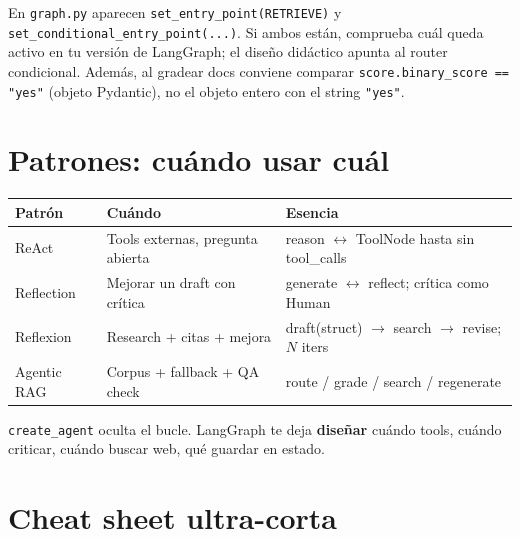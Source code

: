 \documentclass[11pt,a4paper]{article}
\begin{document}
\begin{warn}[title=Detalle del repo]
En \texttt{graph.py} aparecen \texttt{set\_entry\_point(RETRIEVE)} y
\texttt{set\_conditional\_entry\_point(...)}. Si ambos están, comprueba cuál queda activo
en tu versión de LangGraph; el diseño didáctico apunta al router condicional.
Además, al gradear docs conviene comparar \texttt{score.binary\_score == "yes"}
(objeto Pydantic), no el objeto entero con el string \texttt{"yes"}.
\end{warn}

\section{Patrones: cuándo usar cuál}
\label{sec:patterns}

\begin{center}
\begin{tabular}{@{}p{3.2cm}p{5.5cm}p{6.5cm}@{}}
\toprule
\textbf{Patrón} & \textbf{Cuándo} & \textbf{Esencia} \\
\midrule
ReAct & Tools externas, pregunta abierta & reason $\leftrightarrow$ ToolNode hasta sin tool\_calls \\
Reflection & Mejorar un draft con crítica & generate $\leftrightarrow$ reflect; crítica como Human \\
Reflexion & Research + citas + mejora & draft(struct) $\to$ search $\to$ revise; $N$ iters \\
Agentic RAG & Corpus + fallback + QA check & route / grade / search / regenerate \\
\bottomrule
\end{tabular}
\end{center}

\begin{tip}[title=LangGraph vs \texttt{create\_agent}]
\texttt{create\_agent} oculta el bucle.
LangGraph te deja \textbf{diseñar} cuándo tools, cuándo criticar, cuándo buscar web, qué guardar en estado.
\end{tip}

\section{Cheat sheet ultra-corta}
\label{sec:cheatsheet}
\end{document}
